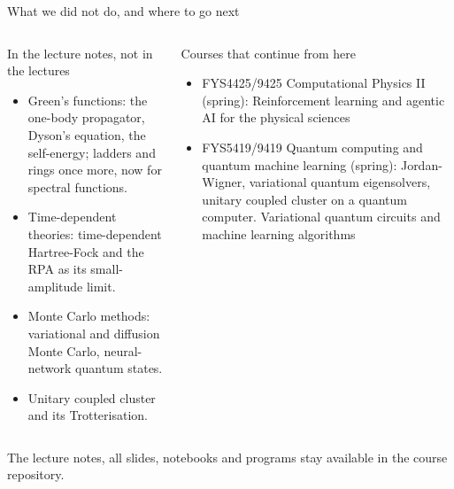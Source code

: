 \documentclass[aspectratio=169,10pt]{beamer}
\begin{document}
\begin{frame}[shrink=3]{What we did not do, and where to go next}
\small
\begin{columns}[T]
\begin{block}{In the lecture notes, not in the lectures}
\begin{itemize}
\item Green's functions: the one-body propagator, Dyson's equation, the self-energy; ladders and rings once more, now for spectral functions.
\item Time-dependent theories: time-dependent Hartree-Fock and the RPA as its small-amplitude limit.
\item Monte Carlo methods: variational and diffusion Monte Carlo, neural-network quantum states.
\item Unitary coupled cluster and its Trotterisation.
\end{itemize}
\end{block}
\begin{block}{Courses that continue from here}
\begin{itemize}
\item FYS4425/9425 Computational Physics II (spring): Reinforcement learning and agentic AI for the physical sciences
\item FYS5419/9419 Quantum computing and quantum machine learning (spring): Jordan-Wigner, variational quantum eigensolvers, unitary coupled cluster on a quantum computer. Variational quantum circuits and machine learning algorithms
\end{itemize}
\end{block}
\end{columns}
\vspace{0.5em}
The lecture notes, all slides, notebooks and programs stay available in the course repository.
\end{frame}
\end{document}
